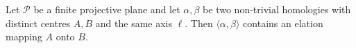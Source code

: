 Let $\mathcal{P}$ be a finite projective plane and let $\alpha, \beta$ be two non-trivial homologies with distinct centres $A, B$ and the same axis $\ell$. Then $\langle\alpha,\beta\rangle$ contains an elation mapping $A$ onto $B$.
